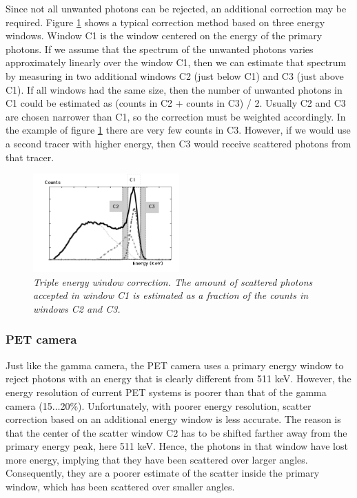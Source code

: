 \documentclass[11pt,oneside]{article}
\begin{document}
Since not all unwanted photons can be rejected, an additional correction may
be required. Figure \ref{fig:TEW_scatter} shows a typical correction method
based on three energy windows. Window C1 is the window centered on the energy
of the primary photons. If we assume that the spectrum of the unwanted photons
varies approximately linearly over the window C1, then we can estimate that
spectrum by measuring in two additional windows C2 (just below C1) and C3
(just above C1). If all windows had the same size, then the number of unwanted
photons in C1 could be estimated as (counts in C2 + counts in C3) / 2. Usually
C2 and C3 are chosen narrower than C1, so the correction must be weighted
accordingly. In the example of figure \ref{fig:TEW_scatter} there are very few
counts in C3. However, if we would use a second tracer with higher energy,
then C3 would receive scattered photons from that tracer.

\begin{figure}[tb]
\centering
\includegraphics[width=0.5\textwidth]{figs/fig_TEW_scatter.pdf}
\caption{\label{fig:TEW_scatter} \emph{Triple energy window correction. The
amount of scattered photons accepted in window C1 is estimated as a fraction
of the counts in windows C2 and C3.}}
\end{figure}

\subsubsection{PET camera} \label{sec:petscatcor}
Just like the gamma camera, the PET camera uses a primary energy
window to reject photons with an energy that is clearly different from
511 keV. However, the energy resolution of current PET systems is
poorer than that of the gamma camera (15$\ldots$20\%). Unfortunately,
with poorer energy resolution, scatter correction based on an
additional energy window is less accurate. The reason is that the
center of the scatter window C2 has to be shifted farther away from
the primary energy peak, here 511 keV. Hence, the photons in that
window have lost more energy, implying that they have been scattered
over larger angles. Consequently, they are a poorer estimate of the
scatter inside the primary window, which has been scattered over
smaller angles.
\end{document}
